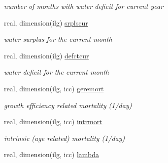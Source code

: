 \begin{DoxyCompactItemize}
\begin{DoxyCompactList}\small\item\em number of months with water deficit for current year \end{DoxyCompactList}\item 
\hypertarget{structctem__statevars_1_1veg__gat_a4651f0a8f8b38aaf3b5037396a38e05c}{}real, dimension(ilg) \hyperlink{structctem__statevars_1_1veg__gat_a4651f0a8f8b38aaf3b5037396a38e05c}{srplscur}\label{structctem__statevars_1_1veg__gat_a4651f0a8f8b38aaf3b5037396a38e05c}

\begin{DoxyCompactList}\small\item\em water surplus for the current month \end{DoxyCompactList}\item 
\hypertarget{structctem__statevars_1_1veg__gat_ae3a96d00e3a3924a0ce827f515d0ab82}{}real, dimension(ilg) \hyperlink{structctem__statevars_1_1veg__gat_ae3a96d00e3a3924a0ce827f515d0ab82}{defctcur}\label{structctem__statevars_1_1veg__gat_ae3a96d00e3a3924a0ce827f515d0ab82}

\begin{DoxyCompactList}\small\item\em water deficit for the current month \end{DoxyCompactList}\item 
\hypertarget{structctem__statevars_1_1veg__gat_a7fee4c4cc3dbd81ba8eb5a1ed177d25e}{}real, dimension(ilg, icc) \hyperlink{structctem__statevars_1_1veg__gat_a7fee4c4cc3dbd81ba8eb5a1ed177d25e}{geremort}\label{structctem__statevars_1_1veg__gat_a7fee4c4cc3dbd81ba8eb5a1ed177d25e}

\begin{DoxyCompactList}\small\item\em growth efficiency related mortality (1/day) \end{DoxyCompactList}\item 
\hypertarget{structctem__statevars_1_1veg__gat_a7174c7b22c4af5ac6544128cef3e6aaa}{}real, dimension(ilg, icc) \hyperlink{structctem__statevars_1_1veg__gat_a7174c7b22c4af5ac6544128cef3e6aaa}{intrmort}\label{structctem__statevars_1_1veg__gat_a7174c7b22c4af5ac6544128cef3e6aaa}

\begin{DoxyCompactList}\small\item\em intrinsic (age related) mortality (1/day) \end{DoxyCompactList}\item 
\hypertarget{structctem__statevars_1_1veg__gat_aa1ceff5811ea74f40ccec80484d8bf9a}{}real, dimension(ilg, icc) \hyperlink{structctem__statevars_1_1veg__gat_aa1ceff5811ea74f40ccec80484d8bf9a}{lambda}\label{structctem__statevars_1_1veg__gat_aa1ceff5811ea74f40ccec80484d8bf9a}


\end{DoxyCompactItemize}
